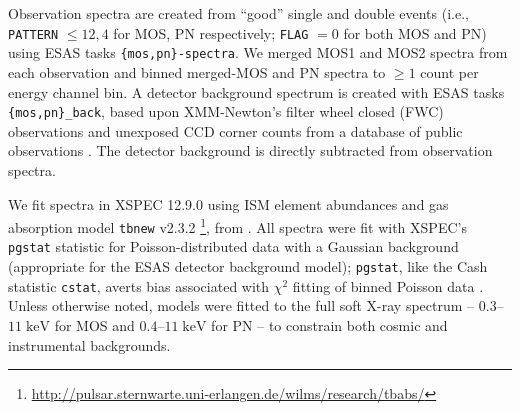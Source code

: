 \documentclass[twocolumn,tighten,trackchanges]{aastex61}
\newcommand*{\mt}{\mathrm}
\newcommand*{\unit}[1]{\;\mt{#1}}  %
\begin{document}
\begin{figure*}[!th]
    \label{fig:eqwidth}
\end{figure*}

Observation spectra are created from ``good'' single and double events (i.e.,
\texttt{PATTERN} $\leq 12,4$ for MOS, PN respectively; \texttt{FLAG} $= 0$ for
both MOS and PN) using ESAS tasks \texttt{\{mos,pn\}-spectra}.
We merged MOS1 and MOS2 spectra from each observation and binned merged-MOS and
PN spectra to $\geq 1$ count per energy channel bin.
A detector background spectrum is created with ESAS tasks
\texttt{\{mos,pn\}\_back}, based upon XMM-Newton's filter wheel closed (FWC)
observations and unexposed CCD corner counts from a database of public
observations \citep[Sec.~3.4]{kuntz2008}.
The detector background is directly subtracted from observation spectra.

We fit spectra in XSPEC 12.9.0 \citep{arnaud1996} using ISM element abundances
and gas absorption model \texttt{tbnew} v2.3.2
\footnote{\url{http://pulsar.sternwarte.uni-erlangen.de/wilms/research/tbabs/}},
from \citet{wilms2000}.
All spectra were fit with XSPEC's \texttt{pgstat} statistic for
Poisson-distributed data with a Gaussian background (appropriate for the ESAS
detector background model); \texttt{pgstat}, like the Cash statistic
\texttt{cstat}, averts bias associated with $\chi^2$ fitting of binned Poisson
data \citep{humphrey2009}.
Unless otherwise noted, models were fitted to the full soft X-ray spectrum --
$0.3$--$11 \unit{keV}$ for MOS and $0.4$--$11 \unit{keV}$ for PN -- to
constrain both cosmic and instrumental backgrounds.
\end{document}
